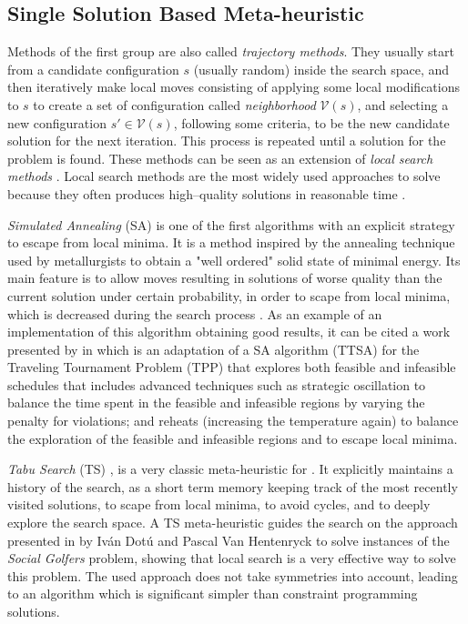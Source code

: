 \subsection{Single Solution Based Meta-heuristic}

Methods of the first group are also called {\it trajectory methods}. They usually start from a candidate configuration $s$ (usually random) inside the search space, and then iteratively make local moves consisting of applying some local modifications to $s$ to create a set of configuration called \textit{neighborhood} $\mathcal{V}\left(s\right)$, and selecting a new configuration $s'\in \mathcal{V}\left(s\right)$, following some criteria, to be the new candidate solution for the next iteration. This process is repeated until a solution for the problem is found. These methods can be seen as an extension of \textit{local search methods} \cite{Boussaid2013}. Local search methods are the most widely used approaches to solve \COPs{} because they often produces high--quality solutions in reasonable time \cite{Voss2012}.
 
{\it Simulated Annealing} (SA) \cite{Nikolaev2010} is one of the first algorithms with an explicit strategy to escape from local minima. It is a method inspired by the annealing technique used by metallurgists to obtain a "well ordered" solid state of minimal energy. Its main feature is to allow moves resulting in solutions of worse quality than the current solution under certain probability, in order to scape from local minima, which is decreased during the search process \cite{Blum2003}. As an example of an implementation of this algorithm obtaining good results, it can be cited a work presented by  in \cite{Anagnostopoulos2006} which is an adaptation of a SA algorithm (TTSA) for the Traveling Tournament Problem (TPP) that explores both feasible and infeasible schedules that includes advanced techniques such as strategic oscillation to balance the time spent in the feasible and infeasible regions by varying the penalty for violations; and reheats (increasing the temperature again) to balance the exploration of the feasible and infeasible regions and to escape local minima.

{\it Tabu Search} (TS) \cite{Gendreau2010}, is a very classic meta-heuristic for \COPs. It explicitly maintains a history of the search, as a short term memory keeping track of the most recently visited solutions, to scape from local minima, to avoid cycles, and to deeply explore the search space. A TS meta-heuristic guides the search on the approach presented in \cite{IvanDotu2007} by Iván Dotú and Pascal Van Hentenryck to solve instances of the \textit{Social Golfers} problem, showing that local search is a very effective way to solve this problem. The used approach does not take symmetries into account, leading to an algorithm which is significant simpler than constraint programming solutions. 


